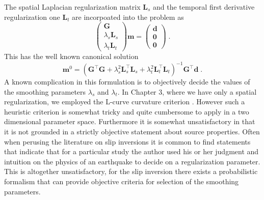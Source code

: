 The spatial Laplacian regularization matrix $\mathbf{L}_s$ and the temporal first derivative regularization one $\mathbf{L}_t$ are incorpoated into the problem as
\begin{equation}
\left(\begin{matrix}
\mathbf{G}\\
\lambda_s\mathbf{L}_s\\ 
\lambda_t\mathbf{L}_t
\end{matrix}\right)
\mathbf{m}=
\left(\begin{matrix}
\mathbf{d}\\
\mathbf{0}\\ 
\mathbf{0}
\end{matrix}\right)\;.
\end{equation}
This has the well known canonical solution \citep{menke2012}
\begin{equation}
\label{eq:solution}
\mathbf{m}^0=
(\mathbf{G}^\top\mathbf{G}+\lambda_s^2\mathbf{L}_s^\top\mathbf{L}_s+\lambda_t^2\mathbf{L}_t^\top\mathbf{L}_t)^{-1}
\mathbf{G}^\top\mathbf{d}\;.
\end{equation}
A known complication in this formulation is to objectively decide the values of the smoothing parameters $\lambda_s$ and $\lambda_t$. In Chapter 3, where we have only a spatial regularization, we employed the L-curve curvature criterion \citep{hansen2007}. However such a heuristic criterion is somewhat tricky and quite cumbersome to apply in a two dimensional parameter space. Furthermore it is somewhat unsatisfactory in that it is not grounded in a strictly objective statement about source properties. Often when perusing the literature on slip inversions it is common to find statements that indicate that for a particular study the author used his or her judgment and intuition on the physics of an earthquake to decide on a regularization parameter. This is altogether unsatisfactory, for the slip inversion there exists a probabilistic formalism that can provide objective criteria for selection of the smoothing parameters.

